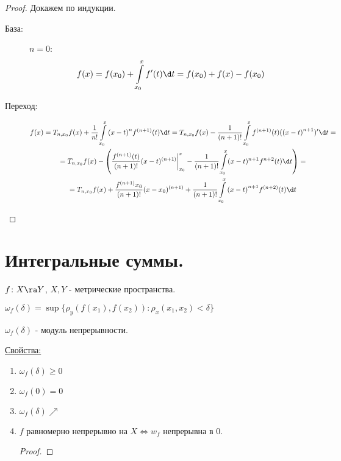 \begin{proof}
	Докажем по индукции.
	
	\begin{description}
		\item[База:] $n = 0$:
		$$f(x) = f(x_0) + \int\limits_{x_0}^{x}f'(t)\d t = f(x_0) + f(x) - f(x_0)$$
		\item[Переход:] 
		\begin{gather*}
			f(x) = T_{n, x_0}f(x) + \frac{1}{n!}\int\limits_{x_0}^x{(x - t)}^nf^{(n + 1)}(t)\d t = T_{n, x_0}f(x) - \frac{1}{(n + 1)!}
			\int\limits_{x_0}^xf^{(n + 1)}(t)({(x - t)}^{n + 1})'\d t = \\
			= T_{n, x_0}f(x) - \left(\frac{f^{(n + 1)}(t)}{(n + 1)!}(x - t)^{(n + 1)}\biggr|_{x_0}^{x} - \frac{1}{(n + 1)!}\int\limits_{x_0}^x(x - t)^{n + 1}f^{n + 2}(t)\d t \right) = \\
			= T_{n, x_0}f(x) + \frac{f^{(n + 1)}x_0}{(n + 1)!}(x - x_0)^{(n + 1)} + \frac{1}{(n + 1)!}\int\limits_{x_0}^x{(x - t)}^{n + 1}f^{(n + 2)}(t)\d t
		\end{gather*}
	\end{description}
\end{proof}

\section{Интегральные суммы.}
\begin{Def}{}
	$f \colon X \ra Y$, $X, Y$ - метрические пространства.

	$\omega_f(\delta) = \sup\{\rho_y(f(x_1), f(x_2)): \rho_x(x_1, x_2) < \delta\}$

	$\omega_f(\delta)$ - модуль непрерывности.
\end{Def}

\underline{Свойства:}
\begin{enumerate}
	\item $\omega_f(\delta) \ge 0$
	\item $\omega_f(0) = 0$
	\item $\omega_f(\delta)\nearrow$
	\item $f$ равномерно непрерывно на $X \Leftrightarrow w_f$ непрерывна в 0.
	\begin{proof}
		\Rightarrow
	\end{proof}
\end{enumerate}